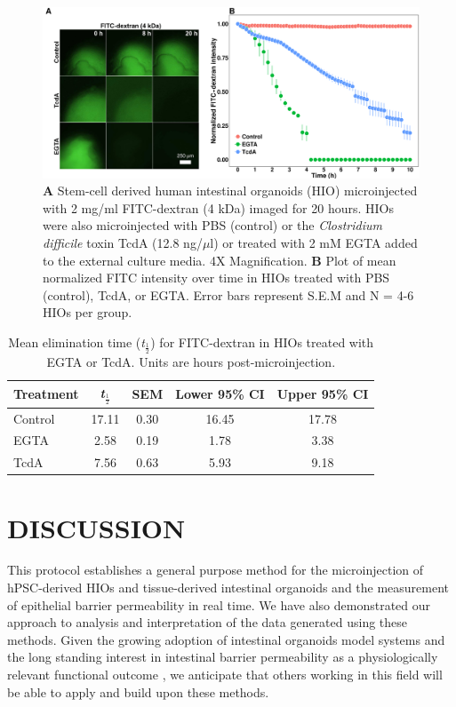 \documentclass[11pt]{article}
\begin{document}
\begin{figure}
\includegraphics[width=0.95\linewidth]{./results/figure4.pdf}
\caption{\textbf{A} Stem-cell derived human intestinal organoids (HIO) microinjected with 2 mg/ml FITC-dextran (4 kDa) imaged for 20 hours. HIOs were also microinjected with PBS (control) or the \textit{Clostridium difficile} toxin TcdA (12.8 ng/$\mu$l) or treated with 2 mM EGTA added to the external culture media. 4X Magnification. \textbf{B} Plot of mean normalized FITC intensity over time in HIOs treated with PBS (control), TcdA, or EGTA. Error bars represent S.E.M and N = 4-6 HIOs per group.}
\end{figure}

\begin{table}[ht]
\centering
\begin{tabular}{l|cccc}
{\bf Treatment} & {\bf \textit{t}$_\frac{1}{2}$} & {\bf SEM} & {\bf Lower 95\% CI} & {\bf Upper 95\% CI} \\ 
  \hline
Control & 17.11 & 0.30 & 16.45 & 17.78 \\ 
EGTA & 2.58 & 0.19 & 1.78 & 3.38 \\ 
TcdA & 7.56 & 0.63 & 5.93 & 9.18 \\ 
\end{tabular}
\caption{Mean elimination time (\textit{t}$_\frac{1}{2}$) for FITC-dextran in HIOs treated with EGTA or TcdA. Units are hours post-microinjection.}
\end{table}


\section*{DISCUSSION}
This protocol establishes a general purpose method for the microinjection of hPSC-derived HIOs and tissue-derived intestinal organoids and the measurement of epithelial barrier permeability in real time. We have also demonstrated our approach to analysis and interpretation of the data generated using these methods. Given the growing adoption of intestinal organoids model systems \supercite{Clevers:2016,Hill:2017,Aurora:2016,Dedhia:2016} and the long standing interest in intestinal barrier permeability as a physiologically relevant functional outcome \supercite{Clayburgh:2004,Turner:2009,Bischoff:2014,Odenwald:2017}, we anticipate that others working in this field will be able to apply and build upon these methods.\\
\end{document}
